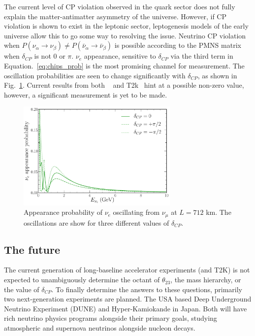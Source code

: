The current level of CP violation observed in the quark sector does not fully explain the
matter-antimatter asymmetry of the universe. However, if CP violation is shown to exist in the
leptonic sector, leptogenesis models of the early universe allow this to go some way to resolving
the issue. Neutrino CP violation when $P(\nu_{\alpha}\rightarrow\nu_{\beta}) \neq
    P(\bar{\nu}_{\alpha}\rightarrow\bar{\nu}_{\beta})$ is possible according to the PMNS matrix when
$\delta_{CP}$ is not 0 or $\pi$. $\nu_{e}$ appearance, sensitive to $\delta_{CP}$ via the third
term in Equation.~\ref{eq:chips_prob} is the most promising channel for measurement. The
oscillation probabilities are seen to change significantly with $\delta_{CP}$, as shown in
Fig.~\ref{fig:osc_cp_probs}. Current results from both \nova~\cite{acero2019} and
T2k~\cite{abe2018_2} hint at a possible non-zero value, however, a significant measurement is yet
to be made.

\begin{figure} %
    \includegraphics[origin=c,width=0.7\textwidth]{diagrams/7-results/explore_osc_cp_probs.pdf}
    \caption[$\nu_{e}$ appearance probability for different $\delta_{CP}$ values]
    {Appearance probability of $\nu_{e}$ oscillating from $\nu_{\mu}$ at $L=712$ km. The
        oscillations are show for three different values of $\delta_{CP}$.}
    \label{fig:osc_cp_probs}
\end{figure}

\subsection{The future} %
\label{sec:theory_status_future} %

The current generation of long-baseline accelerator experiments (\nova and T2K) is not expected to
unambiguously determine the octant of $\theta_{23}$, the mass hierarchy, or the value of
$\delta_{CP}$. To finally determine the answers to these questions, primarily two next-generation
experiments are planned. The USA based Deep Underground Neutrino Experiment (DUNE) and
Hyper-Kamiokande in Japan. Both will have rich neutrino physics programs alongside their primary
goals, studying atmospheric and supernova neutrinos alongside nucleon decays.

